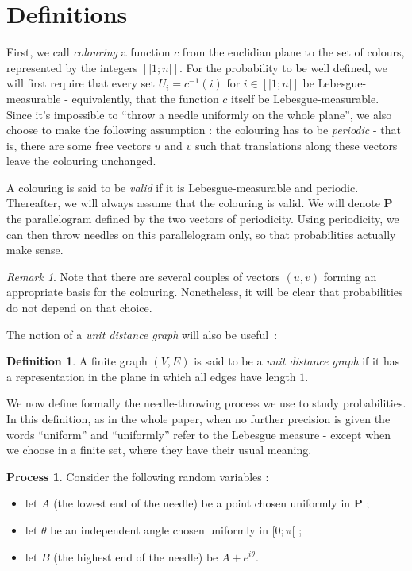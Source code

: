 \documentclass[a4paper,11pt]{article}
\theoremstyle{definition}
\newtheorem{definition}{Definition}
\newtheorem{process}{Process}
\theoremstyle{remark}
\newtheorem{remark}{Remark}
\begin{document}
\section{Definitions}
\label{def}
First, we call \emph{colouring} a function $c$ from the euclidian plane to the 
set of colours, represented by the integers $ [| 1 ; n |]$. For the probability 
to be well defined, we will 
first require that every set $U_i = c^{-1}(i)$ for $i \in [| 1 ; n |]$ be 
Lebesgue-measurable - equivalently, that the function $c$ itself be 
Lebesgue-measurable. Since it's impossible to ``throw a needle uniformly on the 
whole plane'', we also choose to make the following assumption : 
the colouring has to be \textit{periodic} - that is, there are some free vectors 
$u$ and $v$ such that translations along these vectors leave the colouring 
unchanged.

A colouring is said to be \emph{valid} if it is Lebesgue-measurable and 
periodic. Thereafter, we 
will always assume that the colouring is valid. We will denote $\mathbf{P}$ the 
parallelogram defined by the two vectors of periodicity. Using periodicity, 
we can then throw needles on this parallelogram only, so 
that probabilities actually make sense.
\begin{remark}
Note that there are several couples of vectors $(u, v)$ forming an appropriate 
basis for the colouring. Nonetheless, it will be clear that probabilities do not 
depend on that choice. 
\end{remark}

The notion of a \emph{unit distance graph} will also be useful~:
\begin{definition}

A finite graph $(V, E) $ is said to be a \emph{unit distance graph} if it has a 
representation in the plane in which all edges have length $1$.
\end{definition}

We now define formally the needle-throwing process we use to study probabilities. 
In this definition, as in the whole paper, when no further precision 
is given the words ``uniform'' and ``uniformly'' refer to the Lebesgue measure -
except when we choose in a finite set, where they have their usual meaning.
\begin{process} \label{premier}
Consider the following random variables :
\begin{itemize}
  \item let $A$ (the lowest end of the needle) be a point chosen uniformly 
  in $\mathbf{P}$ ;
  \item let $\theta$ be an independent angle chosen uniformly in $[0;\pi[$ ;
  \item let $B$ (the highest end of the needle) be $A + e^{i \theta}$.
\end{itemize}
\end{process}
\end{document}
